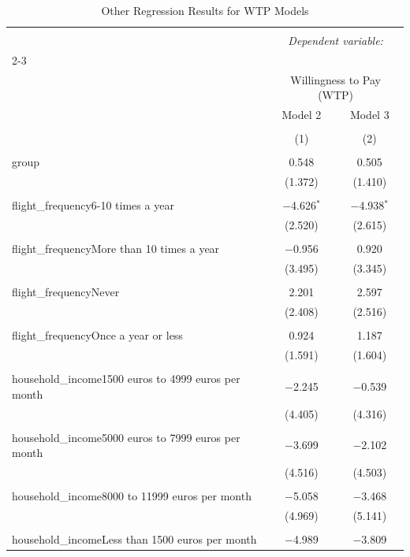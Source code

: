 \documentclass[
]{article}
\begin{document}
\begin{table}[!htbp] \centering 
  \caption{Other Regression Results for WTP Models} 
  \label{} 
\begin{tabular}{@{\extracolsep{5pt}}lcc} 
\\[-1.8ex]\hline 
\hline \\[-1.8ex] 
 & \multicolumn{2}{c}{\textit{Dependent variable:}} \\ 
\cline{2-3} 
\\[-1.8ex] & \multicolumn{2}{c}{Willingness to Pay (WTP)} \\ 
 & Model 2 & Model 3 \\ 
\\[-1.8ex] & (1) & (2)\\ 
\hline \\[-1.8ex] 
 group & 0.548 & 0.505 \\ 
  & (1.372) & (1.410) \\ 
  & & \\ 
 flight\_frequency6-10 times a year & $-$4.626$^{*}$ & $-$4.938$^{*}$ \\ 
  & (2.520) & (2.615) \\ 
  & & \\ 
 flight\_frequencyMore than 10 times a year & $-$0.956 & 0.920 \\ 
  & (3.495) & (3.345) \\ 
  & & \\ 
 flight\_frequencyNever & 2.201 & 2.597 \\ 
  & (2.408) & (2.516) \\ 
  & & \\ 
 flight\_frequencyOnce a year or less & 0.924 & 1.187 \\ 
  & (1.591) & (1.604) \\ 
  & & \\ 
 household\_income1500 euros to 4999 euros per month & $-$2.245 & $-$0.539 \\ 
  & (4.405) & (4.316) \\ 
  & & \\ 
 household\_income5000 euros to 7999 euros per month & $-$3.699 & $-$2.102 \\ 
  & (4.516) & (4.503) \\ 
  & & \\ 
 household\_income8000 to 11999 euros per month & $-$5.058 & $-$3.468 \\ 
  & (4.969) & (5.141) \\ 
  & & \\ 
 household\_incomeLess than 1500 euros per month & $-$4.989 & $-$3.809 \\ 

\end{tabular}
\end{table}
\end{document}
